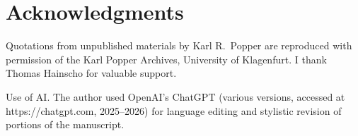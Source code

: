 \documentclass[pdflatex]{sn-jnl}
\begin{document}



\nocite{Popper2006}

\section*{Acknowledgments}

Quotations from unpublished materials by Karl R.~Popper are reproduced with permission of the Karl Popper Archives, University of Klagenfurt. I thank Thomas Hainscho for valuable support.

Use of AI. The author used OpenAI’s ChatGPT (various versions, accessed at https://chatgpt.com, 2025–2026) for language editing and stylistic revision of portions of the manuscript.




\end{document}
